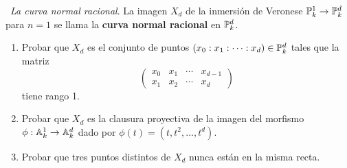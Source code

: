 \documentclass[twoside]{article}
\begin{document}
\newpage 
\begin{ejercicio}{5}\
\emph{La curva normal racional}. La imagen $X_d$ de la inmersión de
Veronese $\mathbb{P}^1_k \to \mathbb{P}^d_k$ para $n = 1$ se llama la \textbf{curva normal racional} en $\mathbb{P}^d_k$.
\begin{enumerate}
\item Probar que $X_d$ es el conjunto de puntos $(x_0 : x_1 : \dots : x_d) \in \mathbb{P}^d_k$ tales que
la matriz 
\[
\begin{pmatrix}
x_0 & x_1 &\cdots& x_{d-1}\\
x_1 & x_2 &\cdots& x_d
\end{pmatrix}
\]
tiene rango 1.
\item Probar que $X_d$ es la clausura proyectiva de la imagen del morfismo $\phi :\mathbb{A}^1_k \to \mathbb{A}^d_k$ dado por $\phi(t) = (t, t^2, \dots , t^d)$.
\item Probar que tres puntos distintos de $X_d$ nunca están en la misma recta.
\end{enumerate}
\end{ejercicio}
\end{document}
